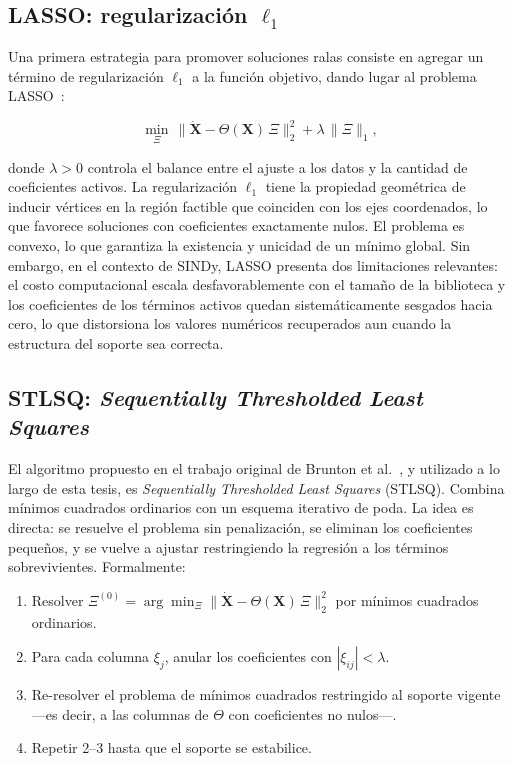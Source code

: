 \subsection{LASSO: regularización $\ell_1$}

Una primera estrategia para promover soluciones ralas consiste en agregar un término de regularización $\ell_1$ a la función objetivo, dando lugar al problema LASSO~\cite{tibshirani1996lasso}:

\[
\min_{\Xi}\, \|\dot{\mathbf{X}} - \Theta(\mathbf{X})\,\Xi\|_2^2 + \lambda\,\|\Xi\|_1,
\]

donde $\lambda > 0$ controla el balance entre el ajuste a los datos y la cantidad de coeficientes activos. La regularización $\ell_1$ tiene la propiedad geométrica de inducir vértices en la región factible que coinciden con los ejes coordenados, lo que favorece soluciones con coeficientes exactamente nulos. El problema es convexo, lo que garantiza la existencia y unicidad de un mínimo global. Sin embargo, en el contexto de SINDy, LASSO presenta dos limitaciones relevantes: el costo computacional escala desfavorablemente con el tamaño de la biblioteca y los coeficientes de los términos activos quedan sistemáticamente sesgados hacia cero, lo que distorsiona los valores numéricos recuperados aun cuando la estructura del soporte sea correcta.

\subsection{STLSQ: \textit{Sequentially Thresholded Least Squares}}

El algoritmo propuesto en el trabajo original de Brunton et al.~\cite{brunton2016pnas}, y utilizado a lo largo de esta tesis, es \textit{Sequentially Thresholded Least Squares} (STLSQ). Combina mínimos cuadrados ordinarios con un esquema iterativo de poda. La idea es directa: se resuelve el problema sin penalización, se eliminan los coeficientes pequeños, y se vuelve a ajustar restringiendo la regresión a los términos sobrevivientes. Formalmente:

\begin{enumerate}
    \item Resolver $\Xi^{(0)} = \arg\min_\Xi \|\dot{\mathbf{X}} - \Theta(\mathbf{X})\,\Xi\|_2^2$ por mínimos cuadrados ordinarios.
    \item Para cada columna $\xi_j$, anular los coeficientes con $|\xi_{ij}| < \lambda$.
    \item Re-resolver el problema de mínimos cuadrados restringido al soporte vigente —es decir, a las columnas de $\Theta$ con coeficientes no nulos—.
    \item Repetir 2--3 hasta que el soporte se estabilice.
\end{enumerate}

